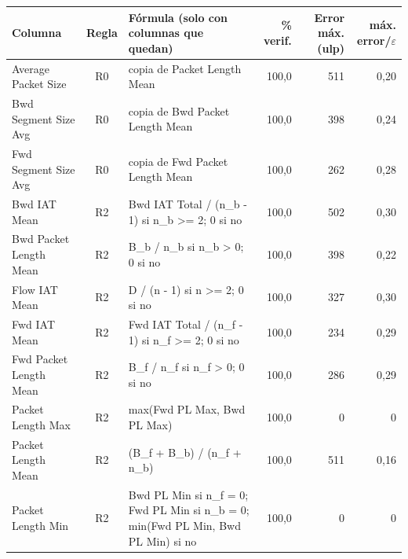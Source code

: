 \begin{tabular}{@{}>{\raggedright\arraybackslash}p{3.1cm}c>{\raggedright\arraybackslash}p{5.4cm}rrr@{}}
\toprule
Columna & Regla & Fórmula (solo con columnas que quedan) & \% verif. & Error máx. (ulp) & máx. error/$\varepsilon$ \\
\midrule
Average Packet Size & R0 & copia de Packet Length Mean & 100{,}0 & 511 & 0{,}20 \\
Bwd Segment Size Avg & R0 & copia de Bwd Packet Length Mean & 100{,}0 & 398 & 0{,}24 \\
Fwd Segment Size Avg & R0 & copia de Fwd Packet Length Mean & 100{,}0 & 262 & 0{,}28 \\
Bwd IAT Mean & R2 & Bwd IAT Total / (n\_b - 1) si n\_b >= 2; 0 si no & 100{,}0 & 502 & 0{,}30 \\
Bwd Packet Length Mean & R2 & B\_b / n\_b si n\_b > 0; 0 si no & 100{,}0 & 398 & 0{,}22 \\
Flow IAT Mean & R2 & D / (n - 1) si n >= 2; 0 si no & 100{,}0 & 327 & 0{,}30 \\
Fwd IAT Mean & R2 & Fwd IAT Total / (n\_f - 1) si n\_f >= 2; 0 si no & 100{,}0 & 234 & 0{,}29 \\
Fwd Packet Length Mean & R2 & B\_f / n\_f si n\_f > 0; 0 si no & 100{,}0 & 286 & 0{,}29 \\
Packet Length Max & R2 & max(Fwd PL Max, Bwd PL Max) & 100{,}0 & 0 & 0 \\
Packet Length Mean & R2 & (B\_f + B\_b) / (n\_f + n\_b) & 100{,}0 & 511 & 0{,}16 \\
Packet Length Min & R2 & Bwd PL Min si n\_f = 0; Fwd PL Min si n\_b = 0; min(Fwd PL Min, Bwd PL Min) si no & 100{,}0 & 0 & 0 \\
\bottomrule
\end{tabular}
